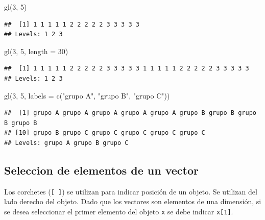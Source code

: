 \documentclass[
]{book}
\newenvironment{Shaded}{\begin{snugshade}}{\end{snugshade}}
\newcommand{\AttributeTok}[1]{\textcolor[rgb]{0.77,0.63,0.00}{#1}}
\newcommand{\DecValTok}[1]{\textcolor[rgb]{0.00,0.00,0.81}{#1}}
\newcommand{\FunctionTok}[1]{\textcolor[rgb]{0.00,0.00,0.00}{#1}}
\newcommand{\NormalTok}[1]{#1}
\newcommand{\StringTok}[1]{\textcolor[rgb]{0.31,0.60,0.02}{#1}}
\begin{document}
\begin{Shaded}
\begin{Highlighting}[]
\FunctionTok{gl}\NormalTok{(}\DecValTok{3}\NormalTok{, }\DecValTok{5}\NormalTok{)}
\end{Highlighting}
\end{Shaded}

\begin{verbatim}
##  [1] 1 1 1 1 1 2 2 2 2 2 3 3 3 3 3
## Levels: 1 2 3
\end{verbatim}

\begin{Shaded}
\begin{Highlighting}[]
\FunctionTok{gl}\NormalTok{(}\DecValTok{3}\NormalTok{, }\DecValTok{5}\NormalTok{, }\AttributeTok{length =} \DecValTok{30}\NormalTok{)}
\end{Highlighting}
\end{Shaded}

\begin{verbatim}
##  [1] 1 1 1 1 1 2 2 2 2 2 3 3 3 3 3 1 1 1 1 1 2 2 2 2 2 3 3 3 3 3
## Levels: 1 2 3
\end{verbatim}

\begin{Shaded}
\begin{Highlighting}[]
\FunctionTok{gl}\NormalTok{(}\DecValTok{3}\NormalTok{, }\DecValTok{5}\NormalTok{, }\AttributeTok{labels =} \FunctionTok{c}\NormalTok{(}\StringTok{"grupo A"}\NormalTok{, }\StringTok{"grupo B"}\NormalTok{, }\StringTok{"grupo C"}\NormalTok{))}
\end{Highlighting}
\end{Shaded}

\begin{verbatim}
##  [1] grupo A grupo A grupo A grupo A grupo A grupo B grupo B grupo B grupo B
## [10] grupo B grupo C grupo C grupo C grupo C grupo C
## Levels: grupo A grupo B grupo C
\end{verbatim}

\hypertarget{seleccion-de-elementos-de-un-vector}{%
\subsection{Seleccion de elementos de un vector}\label{seleccion-de-elementos-de-un-vector}}

Los corchetes (\texttt{{[}\ {]}}) se utilizan para indicar posición de un objeto. Se utilizan del lado derecho del objeto. Dado que los vectores son elementos de una dimensión, si se desea seleccionar el primer elemento del objeto \texttt{x} se debe indicar \texttt{x{[}1{]}}.
\end{document}
